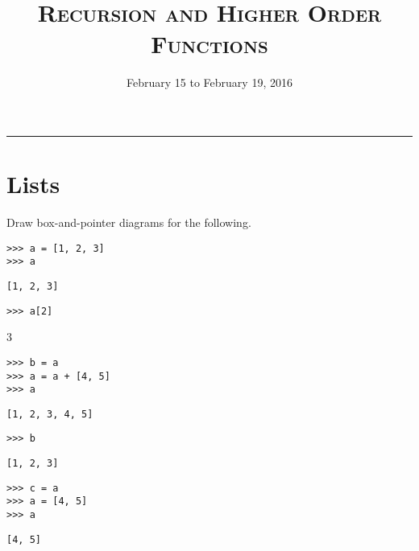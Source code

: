 \documentclass{exam}
\title{\textsc{Recursion and Higher Order Functions}}
\date{February 15 to February 19, 2016}
\begin{document}
\maketitle
\rule{\textwidth}{0.15em}
\fontsize{12}{15}\selectfont


\section{Lists}

\begin{questions}


\begin{blocksection}
\question Draw box-and-pointer diagrams for the following.

\begin{lstlisting}
>>> a = [1, 2, 3]
>>> a
\end{lstlisting}
\begin{solution}[.25in]
\begin{lstlisting}
[1, 2, 3]
\end{lstlisting}
\end{solution}

\begin{lstlisting}
>>> a[2]
\end{lstlisting}
\begin{solution}[.25in]
3
\end{solution}

\begin{lstlisting}
>>> b = a
>>> a = a + [4, 5]
>>> a
\end{lstlisting}
\begin{solution}[.25in]
\begin{lstlisting}
[1, 2, 3, 4, 5]
\end{lstlisting}
\end{solution}

\begin{lstlisting}
>>> b
\end{lstlisting}
\begin{solution}[.25in]
\begin{lstlisting}
[1, 2, 3]
\end{lstlisting}
\end{solution}

\begin{lstlisting}
>>> c = a
>>> a = [4, 5]
>>> a
\end{lstlisting}
\begin{solution}[.25in]
\begin{lstlisting}
[4, 5]
\end{lstlisting}
\end{solution}


\end{blocksection}
\end{questions}
\end{document}
